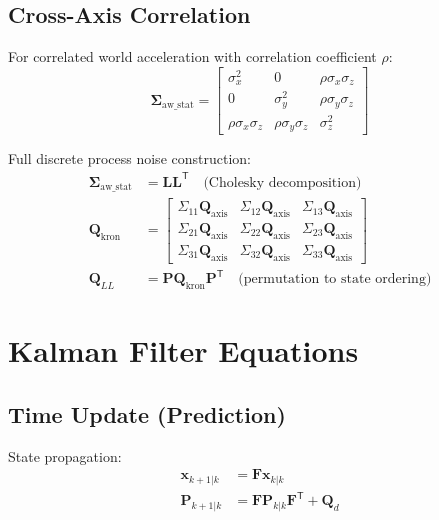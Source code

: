 \documentclass{article}
\newcommand{\vect}[1]{\bm{#1}}
\newcommand{\T}{\mathsf{T}}
\begin{document}
\subsection{Cross-Axis Correlation}

For correlated world acceleration with correlation coefficient $\rho$:
\begin{equation}
\vect{\Sigma}_{\text{aw\_stat}} = 
\begin{bmatrix}
\sigma_x^2 & 0 & \rho\sigma_x\sigma_z \\
0 & \sigma_y^2 & \rho\sigma_y\sigma_z \\
\rho\sigma_x\sigma_z & \rho\sigma_y\sigma_z & \sigma_z^2
\end{bmatrix}
\end{equation}

Full discrete process noise construction:
\begin{align}
\vect{\Sigma}_{\text{aw\_stat}} &= \vect{L}\vect{L}^\T \quad \text{(Cholesky decomposition)} \\
\vect{Q}_{\text{kron}} &= \begin{bmatrix}
\Sigma_{11}\vect{Q}_{\text{axis}} & \Sigma_{12}\vect{Q}_{\text{axis}} & \Sigma_{13}\vect{Q}_{\text{axis}} \\
\Sigma_{21}\vect{Q}_{\text{axis}} & \Sigma_{22}\vect{Q}_{\text{axis}} & \Sigma_{23}\vect{Q}_{\text{axis}} \\
\Sigma_{31}\vect{Q}_{\text{axis}} & \Sigma_{32}\vect{Q}_{\text{axis}} & \Sigma_{33}\vect{Q}_{\text{axis}}
\end{bmatrix} \\
\vect{Q}_{LL} &= \vect{P} \vect{Q}_{\text{kron}} \vect{P}^\T \quad \text{(permutation to state ordering)}
\end{align}

\section{Kalman Filter Equations}

\subsection{Time Update (Prediction)}

State propagation:
\begin{align}
\vect{x}_{k+1|k} &= \vect{F} \vect{x}_{k|k} \\
\vect{P}_{k+1|k} &= \vect{F} \vect{P}_{k|k} \vect{F}^\T + \vect{Q}_d
\end{align}
\end{document}
